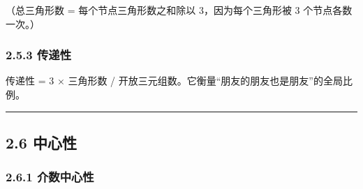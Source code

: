 （总三角形数 = 每个节点三角形数之和除以 3，因为每个三角形被 3
个节点各数一次。）

\subsubsection{2.5.3 传递性}\label{ux4f20ux9012ux6027}

\begin{Shaded}
\begin{Highlighting}[]
\NormalTok{(}
\end{Highlighting}
\end{Shaded}

\begin{Shaded}
\begin{Highlighting}[]
\end{Highlighting}
\end{Shaded}

传递性 = 3 × 三角形数 /
开放三元组数。它衡量``朋友的朋友也是朋友''的全局比例。

\begin{center}\rule{0.5\linewidth}{0.5pt}\end{center}

\subsection{2.6 中心性}\label{ux4e2dux5fc3ux6027}

\subsubsection{2.6.1 介数中心性}\label{ux4ecbux6570ux4e2dux5fc3ux6027}

\begin{Shaded}
\begin{Highlighting}[]
\OperatorTok{=}
\NormalTok{(}
\NormalTok{(}\NormalTok{, }\OperatorTok{=}\NormalTok{, bc[}\OperatorTok{=}\NormalTok{bc.get)])}
\end{Highlighting}
\end{Shaded}

\begin{Shaded}
\begin{Highlighting}[]
\end{Highlighting}
\end{Shaded}

